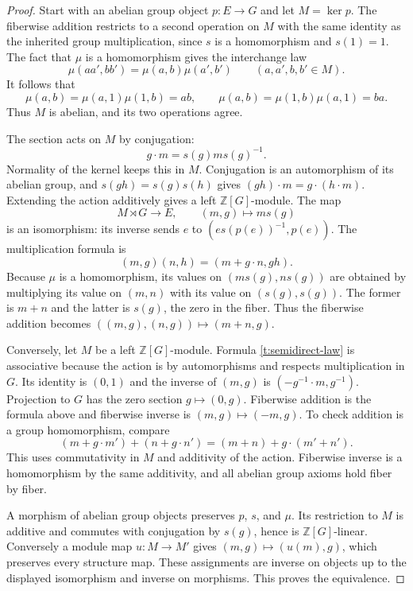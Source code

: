 \documentclass[11pt]{article}
\theoremstyle{definition}
\theoremstyle{remark}\newtheorem{remark}[theorem]{Remark}
\begin{document}
\begin{proof}
Start with an abelian group object $p:E\to G$ and let $M=\ker p$.
The fiberwise addition restricts to a second operation on $M$ with the
same identity as the inherited group multiplication, since $s$ is a
homomorphism and $s(1)=1$.  The fact that $\mu$ is a homomorphism gives
the interchange law
\[
 \mu(aa',bb')=\mu(a,b)\mu(a',b')\qquad(a,a',b,b'\in M).
\]
It follows that
\[
 \mu(a,b)=\mu(a,1)\mu(1,b)=ab,
 \qquad
 \mu(a,b)=\mu(1,b)\mu(a,1)=ba.
\]
Thus $M$ is abelian, and its two operations agree.

The section acts on $M$ by conjugation:
\[
 g\cdot m=s(g)ms(g)^{-1}.
\]
Normality of the kernel keeps this in $M$.  Conjugation is an automorphism
of its abelian group, and $s(gh)=s(g)s(h)$ gives
$(gh)\cdot m=g\cdot(h\cdot m)$.  Extending the action additively gives
a left $\mathbb Z[G]$-module.  The map
\[
 M\rtimes G\longrightarrow E,\qquad (m,g)\longmapsto m s(g)
\]
is an isomorphism: its inverse sends $e$ to
$(e s(p(e))^{-1},p(e))$.  The multiplication formula is
\begin{equation}\label{t:semidirect-law}
 (m,g)(n,h)=(m+g\cdot n,gh).
\end{equation}
Because $\mu$ is a homomorphism, its values on
$(m s(g),n s(g))$ are obtained by multiplying its value on $(m,n)$ with
its value on $(s(g),s(g))$.  The former is $m+n$ and the latter is $s(g)$,
the zero in the fiber.  Thus the fiberwise addition becomes
$((m,g),(n,g))\mapsto(m+n,g)$.

Conversely, let $M$ be a left $\mathbb Z[G]$-module.  Formula
\eqref{t:semidirect-law} is associative because the action is by
automorphisms and respects multiplication in $G$.  Its identity is $(0,1)$
and the inverse of $(m,g)$ is $(-g^{-1}\cdot m,g^{-1})$.
Projection to $G$ has the zero section $g\mapsto(0,g)$.  Fiberwise addition
is the formula above and fiberwise inverse is $(m,g)\mapsto(-m,g)$.
To check addition is a group homomorphism, compare
\[
 (m+g\cdot m')+(n+g\cdot n')
   =(m+n)+g\cdot(m'+n').
\]
This uses commutativity in $M$ and additivity of the action.  Fiberwise
inverse is a homomorphism by the same additivity, and all abelian group
axioms hold fiber by fiber.

A morphism of abelian group objects preserves $p$, $s$, and $\mu$.
Its restriction to $M$ is additive and commutes with conjugation by
$s(g)$, hence is $\mathbb Z[G]$-linear.  Conversely a module map
$u:M\to M'$ gives $(m,g)\mapsto(u(m),g)$, which preserves every structure
map.  These assignments are inverse on objects up to the displayed
isomorphism and inverse on morphisms.  This proves the equivalence.
\end{proof}
\end{document}
